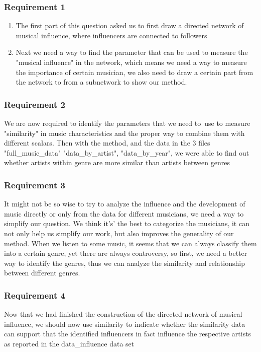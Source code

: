 \documentclass[UTF-8]{article}
\begin{document}
   \subsubsection{Requirement 1} 
    \begin{enumerate}
        \item The first part of this question asked us to first draw a  directed network
        of musical influence, where influencers are connected to followers
        \item Next we need a way to find the parameter that can be used to measure the "musical influence" in the network, which means we need a way to measure the 
        importance of certain musician, we also need to draw a certain part from the network to from a subnetwork to show our method.
    \end{enumerate}
     
    \subsubsection{Requirement 2}
    We are now required to identify the parameters that we need to\
    use to measure "similarity" in music
   characteristics and the proper way to combine them with different scalars. Then with the method, 
   and the data in the 3 files "full\_music\_data"
    "data\_by\_artist", "data\_by\_year",
     we were able to find out whether  artists
     within genre  are more similar  than artists between genres\par
    \subsubsection{Requirement 3}
     It might not be so wise to try to analyze the influence and the development of music directly or only from the data for different musicians, we need a way to simplify our question.
     We think it's' the best to categorize the musicians, it can not only help us simplify our work, but also  improves the generality of our method.
     When we listen to some music, it seems that we can always classify them into a certain genre, yet there are always controversy, so first, we need a better way to identify the genres, thus we can analyze
     the similarity and relationship between different genres. 
    \subsubsection{Requirement 4}
     Now that we had finished the construction of the directed network
     of musical influence, we should now use similarity to indicate whether the similarity data can support
     that the identified influencers in fact influence the respective
     artists as reported in the data\_influence data set
\end{document}
